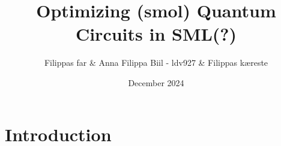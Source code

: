 \documentclass{article}
\title{Optimizing (smol) Quantum Circuits in SML(?)}
\author{Filippas far \& Anna Filippa Biil - ldv927 \& Filippas kæreste }
\date{December 2024}
\begin{document}
\maketitle

\section{Introduction}
\end{document}
